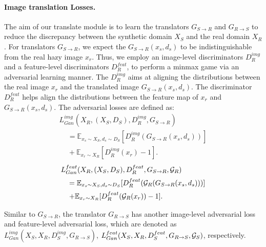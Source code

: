 \documentclass[10pt,twocolumn,letterpaper]{article}
\begin{document}
\paragraph{Image translation Losses.}
The aim of our translate module is to learn the translators ${G_{S \to R}}$ and ${G_{R \to S}}$ to reduce the discrepancy between the synthetic domain ${X_S}$ and the real domain ${X_R}$. 
For translators ${G_{S \to R}}$, we expect the ${G_{S \to R}}({x_s},{d_s})$ to be indistinguishable from the real hazy image ${x_r}$. 
Thus, we employ an image-level discriminators $D_R^{img}$ and a feature-level discriminators $D_R^{feat}$, to perform a minmax game via an adversarial learning manner.
The $D_R^{img}$ aims at aligning the distributions between the real image ${x_r}$ and the translated image ${G_{S \to R}}({x_s},{d_s})$.
The discriminator $D_R^{feat}$ helps align the distributions between the feature map of ${x_r}$ and ${G_{S \to R}}({x_s},{d_s})$.
The adversarial losses are defined as:
\begin{equation}
\label{eqn:DR_img}
      \begin{array}{l}
L_{Gan}^{img}({X_R},({X_S},{D_S}),D_R^{img},{G_{S \to R}})\\[1.8mm]
  \quad \, = {\mathbb{E}_{{x_s} \sim {X_S},{d_s} \sim {D_S}}}[D_R^{img}({G_{S \to R}}({x_s},{d_s}))]\\[1.8mm]
  \quad \, + {\mathbb{E}_{{x_r} \sim {X_R}}}[D_R^{img}({x_r}) - 1].
\end{array}
\end{equation}
\begin{equation}
\label{eqn:DR_fea}
    \begin{array}{l}
L_{Gan}^{feat}({X_R},({X_S},{D_S}),D_R^{feat},{G_{S \to R}},{{\cal G}_{R}})\\[1.8mm]
 \quad \, = {\mathbb{E}_{{x_s} \sim {X_S},{d_s} \sim {D_S}}}[D_R^{feat}({{\cal G}_{R}}({G_{S \to R}}({x_s},{d_s})))]\\[1.8mm]
 \quad \, + {\mathbb{E}_{{x_r} \sim {X_R}}}[D_R^{feat}({{\cal G}_{R}}({x_r})) - 1].
\end{array}
\end{equation}


Similar to ${G_{S \to R}}$, the translator ${G_{R \to S}}$ has another image-level adversarial loss  and feature-level adversarial loss, which are denoted as  $L_{Gan}^{img}({X_S},{X_R},D_S^{img},{G_{R \to S}})$, $L_{Gan}^{feat}({X_S},{X_R},D_S^{feat},{G_{R \to S}},{{\cal G}_{S}})$, respectively.
\end{document}
